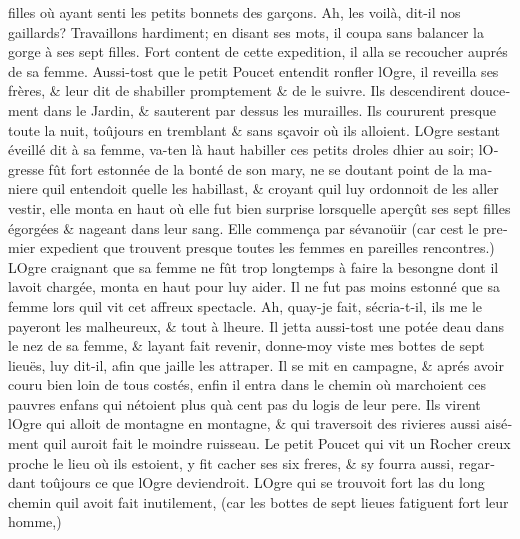 \documentclass[14pt,a4paper]{memoir}
\begin{document}
{{\begin{otherlanguage}{french}
filles où ayant senti les petits bonnets des garçons. Ah, les voilà,
dit-il nos gaillards? Travaillons hardiment; en disant ses mots, il
coupa sans balancer la gorge à ses sept filles. Fort content de cette
expedition, il alla se recoucher auprés de sa femme. Aussi-tost que le
petit Poucet entendit ronfler l\textquotesingle Ogre, il reveilla ses
frères, \& leur dit de s\textquotesingle habiller promptement \& de le
suivre. Ils descendirent doucement dans le Jardin, \& sauterent par
dessus les murailles. Ils coururent presque toute la nuit, toûjours en
tremblant \& sans sçavoir où ils alloient. L\textquotesingle Ogre
s\textquotesingle estant éveillé dit à sa femme, va-t\textquotesingle en
là haut habiller ces petits droles d\textquotesingle hier au soir;
l\textquotesingle Ogresse fût fort estonnée de la bonté de son mary, ne
se doutant point de la maniere qu\textquotesingle il entendoit
qu\textquotesingle elle les habillast, \& croyant qu\textquotesingle il
luy ordonnoit de les aller vestir, elle monta en haut où elle fut bien
surprise lorsqu\textquotesingle elle aperçût ses sept filles égorgées \&
nageant dans leur sang. Elle commença par s\textquotesingle évanoüir
(car c\textquotesingle est le premier expedient que trouvent presque
toutes les femmes en pareilles rencontres.) L\textquotesingle Ogre
craignant que sa femme ne fût trop longtemps à faire la besongne dont il
l\textquotesingle avoit chargée, monta en haut pour luy aider. Il ne fut
pas moins estonné que sa femme lors qu\textquotesingle il vit cet
affreux spectacle. Ah, qu\textquotesingle ay-je fait,
s\textquotesingle écria-t-il, ils me le payeront les malheureux, \& tout
à l\textquotesingle heure. Il jetta aussi-tost une potée
d\textquotesingle eau dans le nez de sa femme, \&
l\textquotesingle ayant fait revenir, donne-moy viste mes bottes de sept
lieuës, luy dit-il, afin que j\textquotesingle aille les attraper. Il se
mit en campagne, \& aprés avoir couru bien loin de tous costés, enfin il
entra dans le chemin où marchoient ces pauvres enfans qui
n\textquotesingle étoient plus qu\textquotesingle à cent pas du logis de
leur pere. Ils virent l\textquotesingle Ogre qui alloit de montagne en
montagne, \& qui traversoit des rivieres aussi aisément
qu\textquotesingle il auroit fait le moindre ruisseau. Le petit Poucet
qui vit un Rocher creux proche le lieu où ils estoient, y fit cacher ses
six freres, \& s\textquotesingle y fourra aussi, regardant toûjours ce
que l\textquotesingle Ogre deviendroit. L\textquotesingle Ogre qui se
trouvoit fort las du long chemin qu\textquotesingle il avoit fait
inutilement, (car les bottes de sept lieues fatiguent fort leur homme,)

\end{otherlanguage}}}
\end{document}
